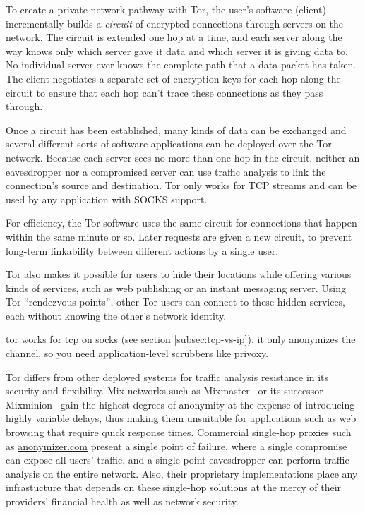\documentclass{llncs}
\begin{document}
To create a private network pathway with Tor, the user's software (client)
incrementally builds a \emph{circuit} of encrypted connections through
servers on the network. The circuit is extended one hop at a time, and
each server along the way knows only which server gave it data and which
server it is giving data to. No individual server ever knows the complete
path that a data packet has taken. The client negotiates a separate set
of encryption keys for each hop along the circuit to ensure that each
hop can't trace these connections as they pass through.

Once a circuit has been established, many kinds of data can be exchanged
and several different sorts of software applications can be deployed over
the Tor network. Because each server sees no more than one hop in the
circuit, neither an eavesdropper nor a compromised server can use traffic
analysis to link the connection's source and destination. Tor only works
for TCP streams and can be used by any application with SOCKS support.

For efficiency, the Tor software uses the same circuit for connections
that happen within the same minute or so. Later requests are given a new
circuit, to prevent long-term linkability between different actions by
a single user.

Tor also makes it possible for users to hide their locations while
offering various kinds of services, such as web publishing or an instant
messaging server. Using Tor ``rendezvous points'', other Tor users can
connect to these hidden services, each without knowing the other's network
identity.

tor works for tcp on socks (see section \ref{subsec:tcp-vs-ip}). it
only anonymizes the channel, so you need application-level scrubbers
like privoxy.

Tor differs from other deployed systems for traffic analysis resistance
in its security and flexibility.  Mix networks such as
Mixmaster~\cite{mixmaster} or its successor Mixminion~\cite{minion-design}
gain the highest degrees of anonymity at the expense of introducing highly
variable delays, thus making them unsuitable for applications such as web
browsing that require quick response times.  Commercial single-hop proxies
such as {\url{anonymizer.com}} present a single point of failure, where
a single compromise can expose all users' traffic, and a single-point
eavesdropper can perform traffic analysis on the entire network.
Also, their proprietary implementations place any infrastucture that
depends on these single-hop solutions at the mercy of their providers'
financial health as well as network security.
\end{document}
